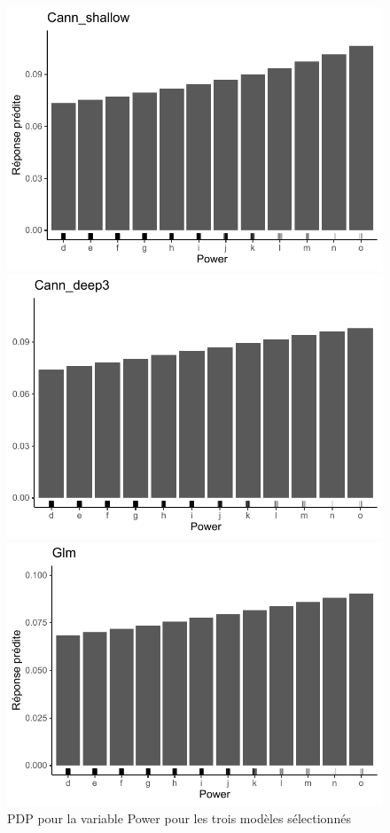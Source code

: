 \begin{figure}[b]
\caption{\label{fig:pdp3Power} PDP pour la variable Power pour les trois modèles sélectionnés}
\centering
\begin{minipage}{0.45\linewidth}
\includegraphics[scale=0.6]{Graphiques/pdpPowerShallow}
\end{minipage}
\hfill
\begin{minipage}{0.45\linewidth}
\includegraphics[scale=0.6]{Graphiques/pdpPowerCann}
\end{minipage}
\hfill
\begin{minipage}{0.45\linewidth}
\includegraphics[scale=0.6]{Graphiques/pdpPowerGlm}

\end{minipage}
\end{figure}
